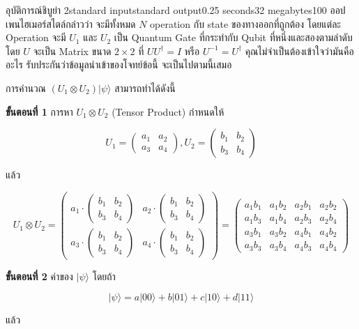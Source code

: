 \documentclass[11pt,a4paper]{article}
\begin{document}
\begin{problem}{อุบัติการณ์ชิบูย่า 2}{standard input}{standard output}{0.25 seconds}{32 megabytes}{100}
ออปเพนไฮเมอร์สไตล์กล่าวว่า จะมีทั้งหมด $N$ operation กับ state ของทางออกที่ถูกต้อง โดยแต่ละ Operation จะมี $U_1$ และ $U_2$ เป็น Quantum Gate ที่กระทำกับ Qubit ที่หนึ่งและสองตามลำดับ โดย $U$ จะเป็น Matrix ขนาด $2\times2$ ที่ $UU^\dagger = I$ หรือ $U^{-1} = U^\dagger$ คุณไม่จำเป็นต้องเข้าใจว่ามันคืออะไร รับประกันว่าข้อมูลนำเข้าของโจทย์ข้อนี้ จะเป็นไปตามนี้เสมอ

การคำนวณ $(U_1 \otimes U_2)|\psi\rangle$ สามารถทำได้ดังนี้

\textbf{ขั้นตอนที่ 1} การหา $U_1 \otimes U_2$ (Tensor Product) กำหนดให้

$$U_1 = \begin{pmatrix}
a_1 & a_2 \\
a_3 & a_4
\end{pmatrix}, U_2 = \begin{pmatrix}
b_1 & b_2 \\
b_3 & b_4
\end{pmatrix}$$

แล้ว

$$U_1 \otimes U_2 = \begin{pmatrix}
a_1\cdot\begin{pmatrix}
b_1 & b_2 \\
b_3 & b_4
\end{pmatrix} & a_2\cdot\begin{pmatrix}
b_1 & b_2 \\
b_3 & b_4
\end{pmatrix} \\
a_3\cdot\begin{pmatrix}
b_1 & b_2 \\
b_3 & b_4
\end{pmatrix} & a_4\cdot\begin{pmatrix}
b_1 & b_2 \\
b_3 & b_4
\end{pmatrix}
\end{pmatrix} = \begin{pmatrix}
a_1b_1 & a_1b_2 & a_2b_1 & a_2b_2 \\
a_1b_3 & a_1b_4 & a_2b_3 & a_2b_4 \\
a_3b_1 & a_3b_2 & a_4b_1 & a_4b_2 \\
a_3b_3 & a_3b_4 & a_4b_3 & a_4b_4
\end{pmatrix}$$

\textbf{ขั้นตอนที่ 2} ค่าของ $|\psi\rangle$ โดยถ้า

$$|\psi\rangle = a|00\rangle + b|01\rangle + c|10\rangle + d|11\rangle$$

แล้ว


\end{problem}
\end{document}
